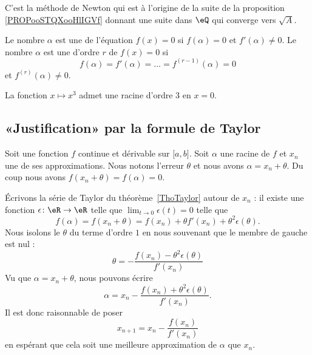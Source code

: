 C'est la méthode de Newton qui est à l'origine de la suite de la proposition \ref{PROPooSTQXooHlIGVf} donnant une suite dans \( \eQ\) qui converge vers \( \sqrt{ A} \).

\begin{definition}      \label{DEFooXSOQooAnWqKM}
	Le nombre \( \alpha\) est une  de l'équation \( f(x)=0\) si \( f(\alpha)=0\) et \( f'(\alpha)\neq 0\). Le nombre \( \alpha\) est une  d'ordre \( r\) de \( f(x)=0\) si
	\begin{equation}
		f(\alpha)=f'(\alpha)=\ldots=f^{(r-1)}(\alpha)=0
	\end{equation}
	et \( f^{(r)}(\alpha)\neq 0\).
\end{definition}

\begin{example}
	La fonction \( x\mapsto x^3\) admet une racine d'ordre \( 3\) en \( x=0\).
\end{example}

\subsection{«Justification» par la formule de Taylor}

Soit une fonction \( f\) continue et dérivable sur \( \mathopen[ a , b \mathclose]\). Soit \( \alpha\) une racine de \( f\) et \( x_n\) une de ses approximations.  Nous notons l'erreur \( \theta\) et nous avons \( \alpha=x_n+\theta\). Du coup nous avons \( f(x_n+\theta)=f(\alpha)=0\).

Écrivons la série de Taylor du théorème~\ref{ThoTaylor} autour de \( x_n\) : il existe une fonction \( \epsilon\colon \eR\to \eR\) telle que \( \lim_{t\to 0} \epsilon(t)=0\) telle que
\begin{equation}        \label{EQooOPUBooYaznay}
	f(\alpha)=f(x_n+\theta)=f(x_n)+\theta f'(x_n)+\theta^2\epsilon(\theta).
\end{equation}
Nous isolons le \( \theta\) du terme d'ordre \( 1\) en nous souvenant que le membre de gauche est nul :
\begin{equation}
	\theta=-\frac{ f(x_n)-\theta^2\epsilon(\theta) }{ f'(x_n) }
\end{equation}
Vu que \( \alpha=x_n+\theta\), nous pouvons écrire
\begin{equation}
	\alpha=x_n-\frac{ f(x_n)+\theta^2\epsilon(\theta) }{ f'(x_n) }.
\end{equation}
Il est donc raisonnable de poser
\begin{equation}
	x_{n+1}=x_n-\frac{ f(x_n) }{ f'(x_n) }
\end{equation}
en espérant que cela soit une meilleure approximation de \( \alpha\) que \( x_n\).

